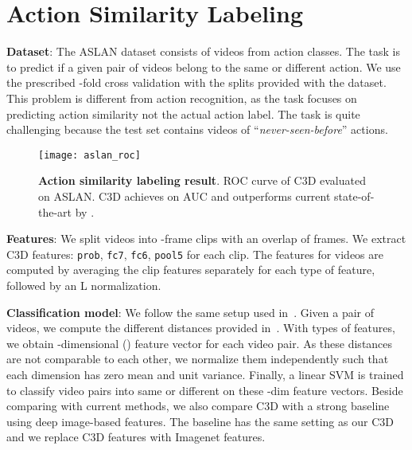 \documentclass[10pt,twocolumn,letterpaper]{article}
\begin{document}
\section{Action Similarity Labeling}
\label{sec:aslan}
{\bf Dataset}: The ASLAN dataset consists of  videos from  action classes. The task is to predict if a given pair of videos belong to the same or different action. We use the prescribed -fold cross validation with the splits provided with the dataset. This problem is different from action recognition, as the task focuses on predicting action similarity not the actual action label. The task is quite challenging because the test set contains videos of ``\emph{never-seen-before}'' actions.

\begin{figure}
\begin{center}
   \texttt{[image: aslan\_roc]}
\end{center}
\vspace{-12pt}
   \caption{{\bf Action similarity labeling result}. ROC curve of C3D evaluated on ASLAN. C3D achieves  on AUC and outperforms current state-of-the-art by .}
\label{fig:aslan_roc}
\end{figure}


{\bf Features}: We split videos into -frame clips with an overlap of  frames. We extract C3D features: \texttt{prob}, \texttt{fc7}, \texttt{fc6}, \texttt{pool5} for each clip. The features for videos are computed by averaging the clip features separately for each type of feature, followed by an L normalization.

{\bf Classification model}: We follow the same setup used in~\cite{aslanPAMI12}. Given a pair of videos, we compute the  different distances provided in~\cite{aslanPAMI12}. With  types of features, we obtain -dimensional () feature vector for each video pair. As these  distances are not comparable to each other, we normalize them independently such that each dimension has zero mean and unit variance. Finally, a linear SVM is trained to classify video pairs into same or different on these -dim feature vectors. Beside comparing with current methods, we also compare C3D with a strong baseline using deep image-based features. The baseline has the same setting as our C3D and we replace C3D features with Imagenet features. 
\end{document}
